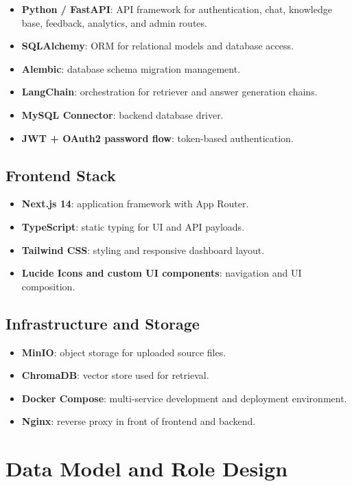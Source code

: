 \documentclass[12pt,a4paper]{report}
\begin{document}
\begin{itemize}[leftmargin=1.5em]
\item \textbf{Python / FastAPI}: API framework for authentication, chat, knowledge base, feedback, analytics, and admin routes.
\item \textbf{SQLAlchemy}: ORM for relational models and database access.
\item \textbf{Alembic}: database schema migration management.
\item \textbf{LangChain}: orchestration for retriever and answer generation chains.
\item \textbf{MySQL Connector}: backend database driver.
\item \textbf{JWT + OAuth2 password flow}: token-based authentication.
\end{itemize}

\section{Frontend Stack}

\begin{itemize}[leftmargin=1.5em]
\item \textbf{Next.js 14}: application framework with App Router.
\item \textbf{TypeScript}: static typing for UI and API payloads.
\item \textbf{Tailwind CSS}: styling and responsive dashboard layout.
\item \textbf{Lucide Icons and custom UI components}: navigation and UI composition.
\end{itemize}

\section{Infrastructure and Storage}

\begin{itemize}[leftmargin=1.5em]
\item \textbf{MinIO}: object storage for uploaded source files.
\item \textbf{ChromaDB}: vector store used for retrieval.
\item \textbf{Docker Compose}: multi-service development and deployment environment.
\item \textbf{Nginx}: reverse proxy in front of frontend and backend.
\end{itemize}

\chapter{Data Model and Role Design}
\end{document}
